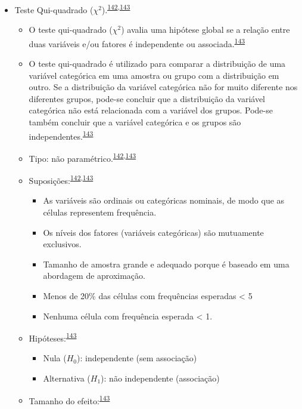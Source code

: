 \documentclass[
]{book}
\begin{document}
\begin{itemize}
\item
  Teste Qui-quadrado (\(\chi^2\)).\textsuperscript{\protect\hyperlink{ref-McHugh2013}{142},\protect\hyperlink{ref-Kim2017a}{143}}

  \begin{itemize}
  \item
    O teste qui-quadrado (\(\chi^2\)) avalia uma hipótese global se a relação entre duas variáveis e/ou fatores é independente ou associada.\textsuperscript{\protect\hyperlink{ref-Kim2017a}{143}}
  \item
    O teste qui-quadrado é utilizado para comparar a distribuição de uma variável categórica em uma amostra ou grupo com a distribuição em outro. Se a distribuição da variável categórica não for muito diferente nos diferentes grupos, pode-se concluir que a distribuição da variável categórica não está relacionada com a variável dos grupos. Pode-se também concluir que a variável categórica e os grupos são independentes.\textsuperscript{\protect\hyperlink{ref-Kim2017a}{143}}
  \item
    Tipo: não paramétrico.\textsuperscript{\protect\hyperlink{ref-McHugh2013}{142},\protect\hyperlink{ref-Kim2017a}{143}}
  \item
    Suposições:\textsuperscript{\protect\hyperlink{ref-McHugh2013}{142},\protect\hyperlink{ref-Kim2017a}{143}}

    \begin{itemize}
    \item
      As variáveis são ordinais ou categóricas nominais, de modo que as células representem frequência.
    \item
      Os níveis dos fatores (variáveis categóricas) são mutuamente exclusivos.
    \item
      Tamanho de amostra grande e adequado porque é baseado em uma abordagem de aproximação.
    \item
      Menos de 20\% das células com frequências esperadas \textless{} 5
    \item
      Nenhuma célula com frequência esperada \textless{} 1.
    \end{itemize}
  \item
    Hipóteses:\textsuperscript{\protect\hyperlink{ref-Kim2017a}{143}}

    \begin{itemize}
    \item
      Nula (\(H_{0}\)): independente (sem associação)
    \item
      Alternativa (\(H_{1}\)): não independente (associação)
    \end{itemize}
  \item
    Tamanho do efeito:\textsuperscript{\protect\hyperlink{ref-Kim2017a}{143}}


\end{itemize}
\end{itemize}
\end{document}
